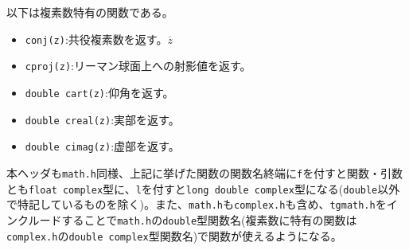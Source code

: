 以下は複素数特有の関数である。
\begin{multicols}{2}
\begin{itemize}
\item \verb|conj(z)|:共役複素数を返す。$\overline{z}$
\item \verb|cproj(z)|:リーマン球面上への射影値を返す。
\item \verb|double cart(z)|:仰角を返す。
\item \verb|double creal(z)|:実部を返す。
\item \verb|double cimag(z)|:虚部を返す。
\end{itemize}
\end{multicols}
本ヘッダも\verb|math.h|同様、上記に挙げた関数の関数名終端に\verb|f|を付すと関数・引数とも\verb|float complex|型に、\verb|l|を付すと\verb|long double complex|型になる(\verb|double|以外で特記しているものを除く)。また、\verb|math.h|も\verb|complex.h|も含め、\verb|tgmath.h|をインクルードすることで\verb|math.h|の\verb|double|型関数名(複素数に特有の関数は\verb|complex.h|の\verb|double complex|型関数名)で関数が使えるようになる。

